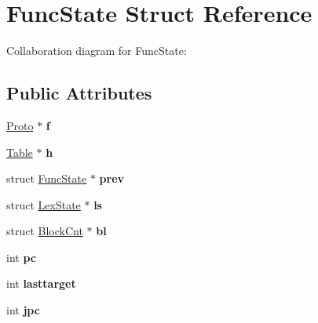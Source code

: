 \hypertarget{struct_func_state}{\section{Func\+State Struct Reference}
\label{struct_func_state}
}


Collaboration diagram for Func\+State\+:
\subsection*{Public Attributes}
\begin{DoxyCompactItemize}
\item 
\hypertarget{struct_func_state_a9eb5835ecb89505391ace26565f4f805}{\hyperlink{struct_proto}{Proto} $\ast$ {\bfseries f}}\label{struct_func_state_a9eb5835ecb89505391ace26565f4f805}

\item 
\hypertarget{struct_func_state_ae7b55ecdb6da87cd03c3bc0e069b4824}{\hyperlink{struct_table}{Table} $\ast$ {\bfseries h}}\label{struct_func_state_ae7b55ecdb6da87cd03c3bc0e069b4824}

\item 
\hypertarget{struct_func_state_aef40521f156a3aceaec2a431a3ba8df0}{struct \hyperlink{struct_func_state}{Func\+State} $\ast$ {\bfseries prev}}\label{struct_func_state_aef40521f156a3aceaec2a431a3ba8df0}

\item 
\hypertarget{struct_func_state_af0b246751acfbdec5bebc850e9e3217a}{struct \hyperlink{struct_lex_state}{Lex\+State} $\ast$ {\bfseries ls}}\label{struct_func_state_af0b246751acfbdec5bebc850e9e3217a}

\item 
\hypertarget{struct_func_state_a43d13c83a7d67d08a48dcc4ad41c2236}{struct \hyperlink{struct_block_cnt}{Block\+Cnt} $\ast$ {\bfseries bl}}\label{struct_func_state_a43d13c83a7d67d08a48dcc4ad41c2236}

\item 
\hypertarget{struct_func_state_ab2fe1df83ece8a6ca9e5cd70859a7b14}{int {\bfseries pc}}\label{struct_func_state_ab2fe1df83ece8a6ca9e5cd70859a7b14}

\item 
\hypertarget{struct_func_state_af20e4cc7f98b798b5319e4015c7ccb04}{int {\bfseries lasttarget}}\label{struct_func_state_af20e4cc7f98b798b5319e4015c7ccb04}

\item 
\hypertarget{struct_func_state_a2a285dc08e7061e4d9f101169aae97d9}{int {\bfseries jpc}}\label{struct_func_state_a2a285dc08e7061e4d9f101169aae97d9}


\end{DoxyCompactItemize}
